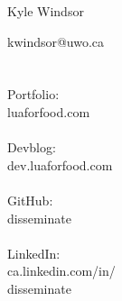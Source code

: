 \documentclass{article}
\begin{document}
{
	{\Huge Kyle Windsor}\\
	\vspace{0.1in}
}

\begin{minipage}[t]{0.25\hsize}\color{contact} %
	kwindsor@uwo.ca\\
	\\\\
	Portfolio:\\
	luaforfood.com\\
	\\
	Devblog:\\
	dev.luaforfood.com\\
	\\
	GitHub:\\
	disseminate\\
	\\
	LinkedIn:\\
	ca.linkedin.com/in/\\
	disseminate\\
\end{minipage}
\end{document}
